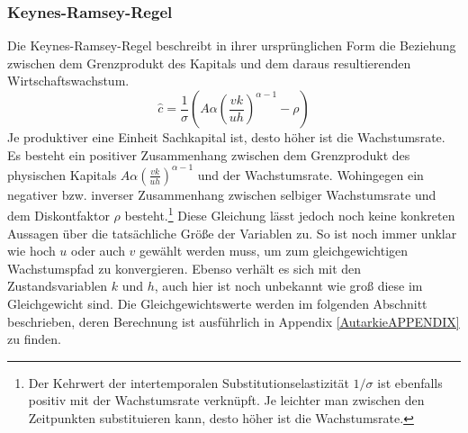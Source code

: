 \subsubsection*{Keynes-Ramsey-Regel}
Die Keynes-Ramsey-Regel beschreibt in ihrer ursprünglichen Form die Beziehung zwischen dem Grenzprodukt des Kapitals und dem daraus resultierenden Wirtschaftswachstum.  
\begin{equation}
\boxed{\hat{c}=\frac{1}{\sigma}\left(A\alpha \left(\frac{vk}{uh}\right)^{\alpha -1}-\rho\right)}\label{KRRWM}
\end{equation}
Je produktiver eine Einheit Sachkapital ist, desto höher ist die Wachstumsrate. Es besteht ein positiver Zusammenhang zwischen dem Grenzprodukt des physischen Kapitals $A\alpha \left(\frac{vk}{uh}\right)^{\alpha -1}$ und der Wachstumsrate. Wohingegen ein negativer bzw. inverser Zusammenhang zwischen selbiger Wachstumsrate und dem Diskontfaktor $\rho$ besteht.\footnote{Der Kehrwert der intertemporalen Substitutionselastizität $1/\sigma$ ist ebenfalls positiv mit der Wachstumsrate verknüpft. Je leichter man zwischen den Zeitpunkten substituieren kann, desto höher ist die Wachstumsrate.} 
Diese Gleichung lässt jedoch noch keine konkreten Aussagen über die tatsächliche Grö{\ss}e der Variablen zu. So ist noch immer unklar wie hoch $u$ oder auch $v$ gewählt werden muss, um zum gleichgewichtigen Wachstumspfad zu konvergieren. Ebenso verhält es sich mit den Zustandsvariablen $k$ und $h$, auch hier ist noch unbekannt wie gro{\ss} diese im Gleichgewicht sind. Die Gleichgewichtswerte werden im folgenden Abschnitt  beschrieben, deren Berechnung ist ausführlich in Appendix \ref{AutarkieAPPENDIX} zu finden. 

